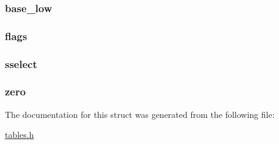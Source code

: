\subsubsection[{base\+\_\+low}]{ base\+\_\+low}\label{structidt__entry__struct_a0a776dced2c26f16298425cde39f8364}
\hypertarget{structidt__entry__struct_a138dda98fcd4738346af61bcca8cf4b4}{}
\subsubsection[{flags}]{ flags}\label{structidt__entry__struct_a138dda98fcd4738346af61bcca8cf4b4}
\hypertarget{structidt__entry__struct_ab3f34507900160b4a9b309b4ed039e07}{}
\subsubsection[{sselect}]{ sselect}\label{structidt__entry__struct_ab3f34507900160b4a9b309b4ed039e07}
\hypertarget{structidt__entry__struct_a94515e42687e7508877c09da81f86860}{}
\subsubsection[{zero}]{ zero}\label{structidt__entry__struct_a94515e42687e7508877c09da81f86860}


The documentation for this struct was generated from the following file\+:\begin{DoxyCompactItemize}
\item 
\hyperlink{tables_8h}{tables.\+h}\end{DoxyCompactItemize}
